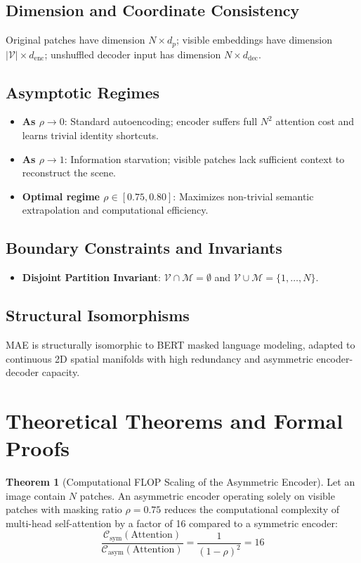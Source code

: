 \documentclass[11pt,a4paper]{article}
\theoremstyle{definition}
\newtheorem{theorem}{\textbf{Theorem}}[section]
\begin{document}
\subsection{Dimension and Coordinate Consistency}
Original patches have dimension $N \times d_p$; visible embeddings have dimension $|\mathcal{V}| \times d_{\text{enc}}$; unshuffled decoder input has dimension $N \times d_{\text{dec}}$.

\subsection{Asymptotic Regimes}
\begin{itemize}
    \item \textbf{As $\rho \to 0$}: Standard autoencoding; encoder suffers full $N^2$ attention cost and learns trivial identity shortcuts.
    \item \textbf{As $\rho \to 1$}: Information starvation; visible patches lack sufficient context to reconstruct the scene.
    \item \textbf{Optimal regime $\rho \in [0.75, 0.80]$}: Maximizes non-trivial semantic extrapolation and computational efficiency.
\end{itemize}

\subsection{Boundary Constraints and Invariants}
\begin{itemize}
    \item \textbf{Disjoint Partition Invariant}: $\mathcal{V} \cap \mathcal{M} = \emptyset$ and $\mathcal{V} \cup \mathcal{M} = \{1, \dots, N\}$.
\end{itemize}

\subsection{Structural Isomorphisms}
MAE is structurally isomorphic to BERT masked language modeling, adapted to continuous 2D spatial manifolds with high redundancy and asymmetric encoder-decoder capacity.

\section{Theoretical Theorems and Formal Proofs}

\begin{theorem}[Computational FLOP Scaling of the Asymmetric Encoder]
Let an image contain $N$ patches. An asymmetric encoder operating solely on visible patches with masking ratio $\rho = 0.75$ reduces the computational complexity of multi-head self-attention by a factor of 16 compared to a symmetric encoder:
{\boldmath
\begin{equation}
\frac{\mathcal{C}_{\text{sym}}(\text{Attention})}{\mathcal{C}_{\text{asym}}(\text{Attention})} = \frac{1}{(1 - \rho)^2} = 16
\end{equation}
}
\end{theorem}
\end{document}
